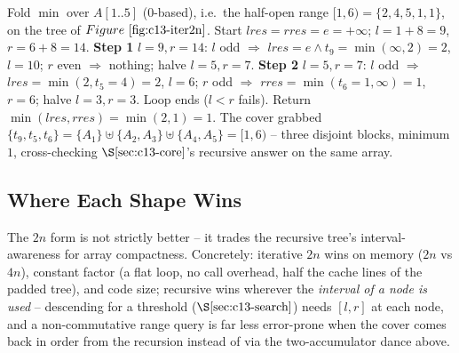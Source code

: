 \begin{tracebox}
Fold \(\min\) over \(A[1..5]\) (0-based), i.e.\ the half-open range
\([1,6)=\{2,4,5,1,1\}\), on the tree of \(\figref{c13-iter2n}\).  Start
\(\mathit{lres}{=}\mathit{rres}{=}e{=}{+}\infty\); \(\mathit{l}=1{+}8{=}9\),
\(\mathit{r}=6{+}8{=}14\).
\textbf{Step 1} \(\mathit{l}{=}9,\mathit{r}{=}14\): \(\mathit{l}\) odd \(\Rightarrow\)
\(\mathit{lres}{=}e\!\wedge\!t_9{=}\min(\infty,2){=}2\), \(\mathit{l}{=}10\);
\(\mathit{r}\) even \(\Rightarrow\) nothing; halve \(\mathit{l}{=}5,\mathit{r}{=}7\).
\textbf{Step 2} \(\mathit{l}{=}5,\mathit{r}{=}7\): \(\mathit{l}\) odd \(\Rightarrow\)
\(\mathit{lres}{=}\min(2,t_5{=}4){=}2\), \(\mathit{l}{=}6\); \(\mathit{r}\) odd
\(\Rightarrow\) \(\mathit{rres}{=}\min(t_6{=}1,\infty){=}1\), \(\mathit{r}{=}6\);
halve \(\mathit{l}{=}3,\mathit{r}{=}3\).  Loop ends (\(\mathit{l}<\mathit{r}\) fails).
Return \(\min(\mathit{lres},\mathit{rres}){=}\min(2,1){=}1\).  The cover grabbed
\(\{t_9,t_5,t_6\}=\{A_1\}\uplus\{A_2,A_3\}\uplus\{A_4,A_5\}=[1,6)\) -- three
disjoint blocks, minimum \(1\), cross-checking \(\secref{c13-core}\)'s recursive
answer on the same array.
\end{tracebox}

\subsection{Where Each Shape Wins}

The \(2n\) form is not strictly better -- it trades the recursive tree's
interval-awareness for array compactness.  Concretely: iterative \(2n\) wins on
memory (\(2n\) vs \(4n\)), constant factor (a flat loop, no call overhead, half
the cache lines of the padded tree), and code size; recursive wins wherever the
\emph{interval of a node is used} -- descending for a threshold
(\(\secref{c13-search}\)) needs \([l,r]\) at each node, and a non-commutative
range query is far less error-prone when the cover comes back in order from the
recursion instead of via the two-accumulator dance above.

